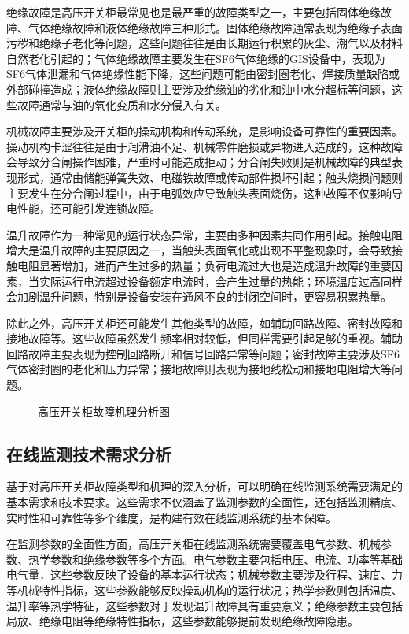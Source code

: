 绝缘故障是高压开关柜最常见也是最严重的故障类型之一，主要包括固体绝缘故障、气体绝缘故障和液体绝缘故障三种形式。固体绝缘故障通常表现为绝缘子表面污秽和绝缘子老化等问题，这些问题往往是由长期运行积累的灰尘、潮气以及材料自然老化引起的；气体绝缘故障主要发生在SF6气体绝缘的GIS设备中，表现为SF6气体泄漏和气体绝缘性能下降，这些问题可能由密封圈老化、焊接质量缺陷或外部碰撞造成；液体绝缘故障则主要涉及绝缘油的劣化和油中水分超标等问题，这些故障通常与油的氧化变质和水分侵入有关。

机械故障主要涉及开关柜的操动机构和传动系统，是影响设备可靠性的重要因素。操动机构卡涩往往是由于润滑油不足、机械零件磨损或异物进入造成的，这种故障会导致分合闸操作困难，严重时可能造成拒动；分合闸失败则是机械故障的典型表现形式，通常由储能弹簧失效、电磁铁故障或传动部件损坏引起；触头烧损问题则主要发生在分合闸过程中，由于电弧效应导致触头表面烧伤，这种故障不仅影响导电性能，还可能引发连锁故障。

温升故障作为一种常见的运行状态异常，主要由多种因素共同作用引起。接触电阻增大是温升故障的主要原因之一，当触头表面氧化或出现不平整现象时，会导致接触电阻显著增加，进而产生过多的热量；负荷电流过大也是造成温升故障的重要因素，当实际运行电流超过设备额定电流时，会产生过量的热能；环境温度过高同样会加剧温升问题，特别是设备安装在通风不良的封闭空间时，更容易积累热量。

除此之外，高压开关柜还可能发生其他类型的故障，如辅助回路故障、密封故障和接地故障等。这些故障虽然发生频率相对较低，但同样需要引起足够的重视。辅助回路故障主要表现为控制回路断开和信号回路异常等问题；密封故障主要涉及SF6气体密封圈的老化和压力异常；接地故障则表现为接地线松动和接地电阻增大等问题。

\begin{figure}[h]
\centering
\caption{高压开关柜故障机理分析图}
\label{fig:fault_mechanism}
\end{figure}

\subsection{在线监测技术需求分析}

基于对高压开关柜故障类型和机理的深入分析，可以明确在线监测系统需要满足的基本需求和技术要求。这些需求不仅涵盖了监测参数的全面性，还包括监测精度、实时性和可靠性等多个维度，是构建有效在线监测系统的基本保障。

在监测参数的全面性方面，高压开关柜在线监测系统需要覆盖电气参数、机械参数、热学参数和绝缘参数等多个方面。电气参数主要包括电压、电流、功率等基础电气量，这些参数反映了设备的基本运行状态；机械参数主要涉及行程、速度、力等机械特性指标，这些参数能够反映操动机构的运行状况；热学参数则包括温度、温升率等热学特征，这些参数对于发现温升故障具有重要意义；绝缘参数主要包括局放、绝缘电阻等绝缘特性指标，这些参数能够提前发现绝缘故障隐患。

